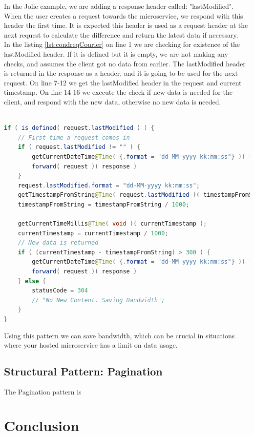 \documentclass[12pt]{article}
\begin{document}
In the Jolie example, we are adding a response header called: "lastModified". When the user creates a request towards the microservice, we respond with this header the first time. It is expected this header is used as a request header at the next request to calculate the difference and return the latest data if necessary. \\
In the listing \ref{lst:condreqCourier} on line 1 we are checking for existence of the lastModified header. If it is defined but it is empty, we are not making any checks, and assumes the client got no data from earlier. The lastModified header is returned in the response as a header, and it is going to be used for the next request. On line 7-12 we get the lastModified header in the request and current timestamp. On line 14-16 we execute the check if new data is needed for the client, and respond with the new data, otherwise no new data is needed. 

\begin{lstlisting}[caption=Courier operations for the Conditional Request service, 
    captionpos=b, language=java, label=condreqCourier, frame=single]

if ( is_defined( request.lastModified ) ) {
    // First time a request comes in
    if ( request.lastModified != "" ) {
        getCurrentDateTime@Time( {.format = "dd-MM-yyyy kk:mm:ss"} )( lastModified );
        forward( request )( response )
    }
    request.lastModified.format = "dd-MM-yyyy kk:mm:ss";
    getTimestampFromString@Time( request.lastModified )( timestampFromString );
    timestampFromString = timestampFromString / 1000;

    getCurrentTimeMillis@Time( void )( currentTimestamp );
    currentTimestamp = currentTimestamp / 1000;
    // New data is returned
    if ( (currentTimestamp - timestampFromString) > 300 ) {
        getCurrentDateTime@Time( {.format = "dd-MM-yyyy kk:mm:ss"} )( lastModified );
        forward( request )( response )
    } else {
        statusCode = 304
        // "No New Content. Saving Bandwidth";
    }
} 
\end{lstlisting}
    
Using this pattern we can save bandwidth, which can be crucial in situations where your hosted microservice has a limit on data usage. 

\subsection{Structural Pattern: Pagination}
The Pagination pattern is  

\section{Conclusion}

\newpage


\end{document}
